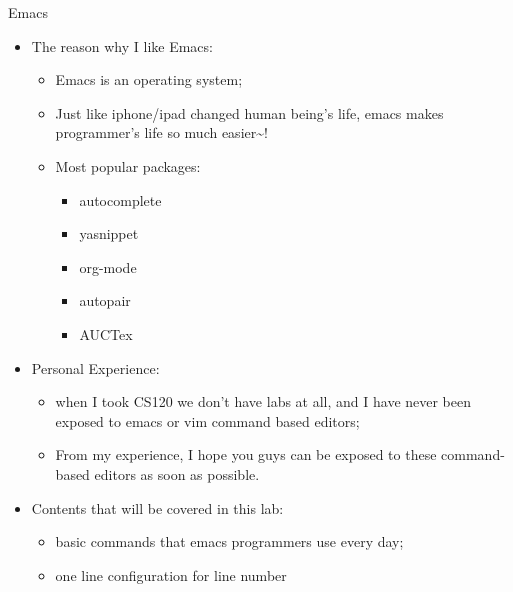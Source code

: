 \documentclass[presentation]{beamer}
\begin{document}
\begin{frame}[label=sec-7]{Emacs}
\begin{itemize}
\item The reason why I like Emacs:
\begin{itemize}
\item Emacs is an \alert{operating system};
\item Just like iphone/ipad changed human being's life, emacs \alert{makes programmer's life so much easier\textasciitilde{}!}
\item Most popular packages: 
\begin{itemize}
\item \alert{autocomplete}
\item \alert{yasnippet}
\item \alert{org-mode}
\item autopair
\item AUCTex
\end{itemize}
\end{itemize}
\item Personal Experience:
\begin{itemize}
\item when I took CS120 we don't have labs at all, and I have never been exposed to \alert{emacs} or \alert{vim} command based editors;
\item From my experience, I hope you guys can be exposed to these command-based editors \alert{as soon as possible}.
\end{itemize}
\item Contents that will be covered in this lab:
\begin{itemize}
\item \alert{basic commands} that emacs programmers use every day;
\item one line \alert{configuration} for line number
\end{itemize}
\end{itemize}
\end{frame}
\end{document}

